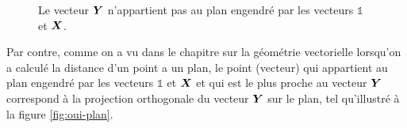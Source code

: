 \begin{figure}[h]
\caption{\label{fig:nonplan}
Le vecteur  $\boldsymbol{Y}$ n'appartient pas au plan engendré par les vecteurs 
$\mathds{1}$ et $\boldsymbol{X}$.
}
\end{figure}

Par contre, comme on a vu dans le chapitre sur la géométrie vectorielle
lorsqu'on a calculé la distance d'un point a un plan, le point (vecteur) qui
appartient au plan engendré par les vecteurs $\mathds{1}$ et $\boldsymbol{X}$
et qui est le plus proche au vecteur $\boldsymbol{Y}$ correspond à la projection
orthogonale du vecteur $\boldsymbol{Y}$ sur le plan, tel qu'illustré
à la figure \ref{fig:oui-plan}.


